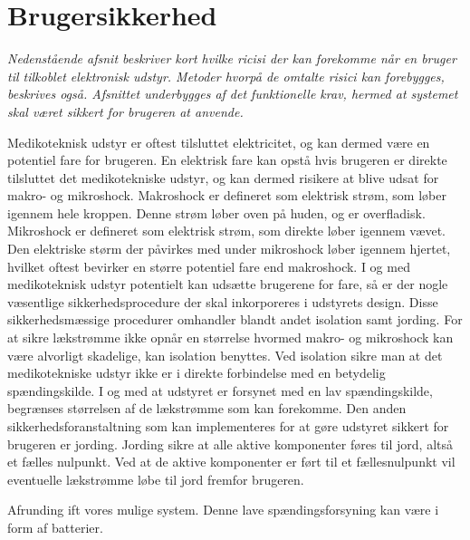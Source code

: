 \section{Brugersikkerhed}
\textit{Nedenstående afsnit beskriver kort hvilke ricisi der kan forekomme når en bruger til tilkoblet elektronisk udstyr. Metoder hvorpå de omtalte risici kan forebygges, beskrives også. Afsnittet underbygges af det funktionelle krav, hermed at systemet skal været sikkert for brugeren at anvende.}

Medikoteknisk udstyr er oftest tilsluttet elektricitet, og  kan dermed være en potentiel fare for brugeren. En elektrisk fare kan opstå hvis brugeren er direkte tilsluttet det medikotekniske udstyr, og kan dermed risikere at blive udsat for makro- og mikroshock. Makroshock er defineret som elektrisk strøm, som løber igennem hele kroppen. Denne strøm løber oven på huden, og er overfladisk. Mikroshock er defineret som elektrisk strøm, som direkte løber igennem vævet. Den elektriske størm der påvirkes med under mikroshock løber igennem hjertet, hvilket oftest bevirker en større potentiel fare end makroshock. \newline
I og med medikoteknisk udstyr potentielt kan udsætte brugerene for fare, så er der nogle væsentlige sikkerhedsprocedure der skal inkorporeres i udstyrets design. Disse sikkerhedsmæssige procedurer omhandler blandt andet isolation samt jording. For at sikre lækstrømme ikke opnår en størrelse hvormed makro- og mikroshock kan være alvorligt skadelige, kan isolation benyttes. Ved isolation sikre man at det medikotekniske udstyr ikke er i direkte forbindelse med en betydelig spændingskilde. I og med at udstyret er forsynet med en lav spændingskilde, begrænses størrelsen af de lækstrømme som kan forekomme. Den anden sikkerhedsforanstaltning som kan implementeres for at gøre udstyret sikkert for brugeren er jording. Jording sikre at alle aktive komponenter føres til jord, altså et fælles nulpunkt. Ved at de aktive komponenter er ført til et fællesnulpunkt vil eventuelle lækstrømme løbe til jord fremfor brugeren. 

Afrunding ift vores mulige system.  Denne lave spændingsforsyning kan være i form af batterier. 
